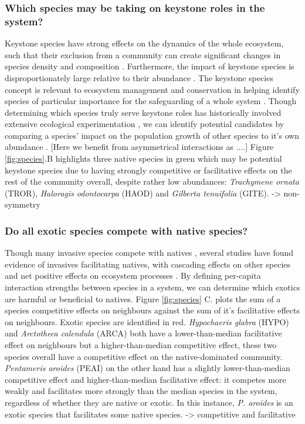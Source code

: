 \documentclass[a4,12pt]{article}
\begin{document}
    \subsubsection*{Which species may be taking on keystone roles in the system?}
    Keystone species have strong effects on the dynamics of the whole ecosystem, such that their exclusion from a community can create significant changes in species density and composition \parencite{Paine1969}. Furthermore, the impact of keystone species is disproportionately large relative to their abundance \parencite{Power1996, Piraino2002, Libralato2006}. The keystone species concept is  relevant to ecosystem management and conservation in helping identify species of particular importance for the safeguarding of a whole system \parencite{Soule2005a}. Though determining which species truly serve keystone roles has historically involved extensive ecological experimentation \parencite{}, we can identify potential candidates by comparing a species' impact on the population growth of other species to it's own abundance \parencite{Libralato2006}. [Here we benefit from asymmetrical interactions as ....] Figure \ref{fig:species}.B highlights three native species in green which may be potential keystone species due to having strongly competitive or facilitative effects on the rest of the community overall, despite rather low abundances: \textit{Trachymene ornata} (TROR), \textit{Haloragis odontocarpa} (HAOD) and \textit{Gilberta tenuifolia} (GITE). 
    -> non-symmetry

    \subsubsection*{Do all exotic species compete with native species?}
    Though many invasive species compete with natives \parencite{Naeem2000, Corbin2004, Riley2008, Zheng2015}, several studies have found evidence of invasives facilitating natives, with cascading effects on other species and net positive effects on ecosystem processes \parencite{Rodriguez2006, Ramus2017}. By defining per-capita interaction strengths between species in a system, we can determine which exotics are harmful or beneficial to natives. Figure \ref{fig:species} C. plots the sum of a species competitive effects on neighbours against the sum of it's facilitative effects on neighbours. Exotic species are identified in red. \textit{Hypochaeris glabra} (HYPO) and \textit{Arctotheca calendula} (ARCA) both have a lower-than-median facilitative effect on neighbours but a higher-than-median competitive effect, these two species overall have a competitive effect on the native-dominated community. \textit{Pentameris aroides} (PEAI) on the other hand has a slightly lower-than-median competitive effect and higher-than-median facilitative effect: it competes more weakly and facilitates more strongly than the median species in the system, regardless of whether they are native or exotic. In this instance, \textit{P. aroides} is an exotic species that facilitates some native species.
    -> competitive and facilitative
\end{document}
